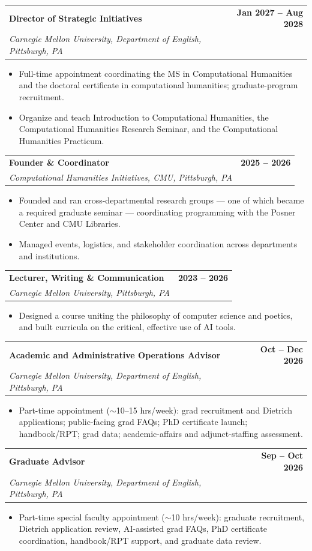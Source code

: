 \documentclass[11pt,letterpaper]{article}
\makeatletter
\newcommand{\entry}[4]{%
  \noindent\begin{tabularx}{\linewidth}{@{}X r@{}}
    \textbf{#1} & \textbf{#4}\\
    \textit{#2, #3} & \\
  \end{tabularx}\vspace{1pt}}
\makeatother
\begin{document}
\entry{Director of Strategic Initiatives}{Carnegie Mellon University, Department of English}{Pittsburgh, PA}{Jan 2027 -- Aug 2028}
\begin{itemize}
  \item Full-time appointment coordinating the MS in Computational Humanities and the doctoral certificate in computational humanities; graduate-program recruitment.
  \item Organize and teach Introduction to Computational Humanities, the Computational Humanities Research Seminar, and the Computational Humanities Practicum.
\end{itemize}
\vspace{5pt}

\entry{Founder \& Coordinator}{Computational Humanities Initiatives, CMU}{Pittsburgh, PA}{2025 -- 2026}
\begin{itemize}
  \item Founded and ran cross-departmental research groups --- one of which became a required graduate seminar --- coordinating programming with the Posner Center and CMU Libraries.
  \item Managed events, logistics, and stakeholder coordination across departments and institutions.
\end{itemize}
\vspace{5pt}

\entry{Lecturer, Writing \& Communication}{Carnegie Mellon University}{Pittsburgh, PA}{2023 -- 2026}
\begin{itemize}
  \item Designed a course uniting the philosophy of computer science and poetics, and built curricula on the critical, effective use of AI tools.
\end{itemize}
\vspace{5pt}

\entry{Academic and Administrative Operations Advisor}{Carnegie Mellon University, Department of English}{Pittsburgh, PA}{Oct -- Dec 2026}
\begin{itemize}
  \item Part-time appointment ($\sim$10--15 hrs/week): grad recruitment and Dietrich applications; public-facing grad FAQs; PhD certificate launch; handbook/RPT; grad data; academic-affairs and adjunct-staffing assessment.
\end{itemize}
\vspace{5pt}

\entry{Graduate Advisor}{Carnegie Mellon University, Department of English}{Pittsburgh, PA}{Sep -- Oct 2026}
\begin{itemize}
  \item Part-time special faculty appointment ($\sim$10 hrs/week): graduate recruitment, Dietrich application review, AI-assisted grad FAQs, PhD certificate coordination, handbook/RPT support, and graduate data review.
\end{itemize}
\end{document}
